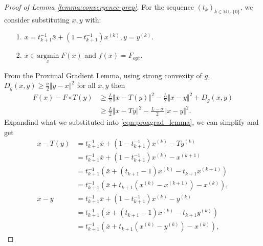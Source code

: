     \begin{proof}[Proof of Lemma \ref*{lemma:convergence-prep}]\label{proof:vfist-convergence-prep}
        For the sequence $(t_k)_{k\in \mathbb N\cup \{0\}}$, we consider substituting $x, y$ with:
        \begin{itemize}
            \item [1.] $x = t^{-1}_{k + 1}\bar x + (1 - t^{-1}_{k + 1})x^{(k)}, y = y^{(k)}$. 
            \item [2.] $\bar x \in \underset{x}{\text{argmin}}\; F(x)$ and $f(\bar x) = F_{\text{opt}}$. 
        \end{itemize}
        From the Proximal Gradient Lemma, using strong convexity of $g$, $D_g(x, y) \ge \frac{\sigma}{2}\Vert y - x\Vert^2$ for all $x, y$ then
        \begin{align}
            F(x) - F\circ T(y) &\ge 
            \frac{L}{2}\Vert x - T (y)\Vert^2 - \frac{L}{2}\Vert x - y\Vert^2 + D_g(x, y)
            \\
            & \ge \frac{L}{2}\Vert x - Ty\Vert^2 - \frac{L - \sigma}{2}\Vert x - y\Vert^2. 
        \end{align}\label{eqn:proxgrad_lemma}
        Expandind what we substituted into \hyperref[eqn:proxgrad_lemma]{\ref*{eqn:proxgrad_lemma}}, we can simplify and get
        \begin{align*}
            x - T(y) &=  t^{-1}_{k+1} \bar x + (1 - t^{-1}_{k+1}) x^{(k)} - T y^{(k)}
            \\
            &= t^{-1}_{k+1} \bar x + (1 - t^{-1}_{k+1}) x^{(k)} - x^{(k + 1)}
            \\
            &= t^{-1}_{k + 1}\left(
                \bar x + (t_{k+1} - 1)x^{(k)} - t_{k+1}x^{(k + 1)}
            \right)
            \\
            &= t^{-1}_{k + 1} \left(
                \bar x + t_{k+1} \left(
                    x^{(k)} - x^{(k + 1)}
                \right) - x^{(k)}
            \right), 
            \\
            x - y &= t^{-1}_{k+1} \bar x + (1 - t_{k+1}^{-1}) x^{(k)} - y^{(k)}
            \\
            &= t^{-1}_{k + 1}\left(
                \bar x + (t_{k+1} - 1)x^{(k)} - t_{k+1} y^{(k)}
            \right)
            \\
            &= t^{-1}_{k + 1}
            \left(
                \bar x + t_{k+1} \left(
                    x^{(k)} - y^{(k)}
                \right) - x^{(k)}
            \right), 
        \end{align*}

\end{proof}
